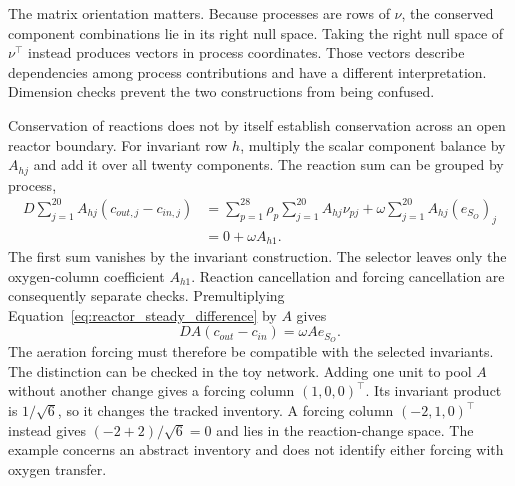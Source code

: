 The matrix orientation matters. Because processes are rows of $\nu$, the conserved component combinations lie in its right null space. Taking the right null space of $\nu^\top$ instead produces vectors in process coordinates. Those vectors describe dependencies among process contributions and have a different interpretation. Dimension checks prevent the two constructions from being confused.

Conservation of reactions does not by itself establish conservation across an open reactor boundary. For invariant row $h$, multiply the scalar component balance by $A_{hj}$ and add it over all twenty components. The reaction sum can be grouped by process,
\[
\begin{aligned}
D\sum_{j=1}^{20}A_{hj}(c_{out,j}-c_{in,j})
&=\sum_{p=1}^{28}\rho_p\sum_{j=1}^{20}A_{hj}\nu_{pj}
+\omega\sum_{j=1}^{20}A_{hj}(e_{S_O})_j\\
&=0+\omega A_{h1}.
\end{aligned}
\]
The first sum vanishes by the invariant construction. The selector leaves only the oxygen-column coefficient $A_{h1}$. Reaction cancellation and forcing cancellation are consequently separate checks. Premultiplying Equation~\eqref{eq:reactor_steady_difference} by $A$ gives
\begin{equation}
D A(c_{out}-c_{in})=\omega A e_{S_O}.
\label{eq:invariant_boundary_balance}
\end{equation}
The aeration forcing must therefore be compatible with the selected invariants. The distinction can be checked in the toy network. Adding one unit to pool $A$ without another change gives a forcing column $(1,0,0)^\top$. Its invariant product is $1/\sqrt6$, so it changes the tracked inventory. A forcing column $(-2,1,0)^\top$ instead gives $(-2+2)/\sqrt6=0$ and lies in the reaction-change space. The example concerns an abstract inventory and does not identify either forcing with oxygen transfer.

